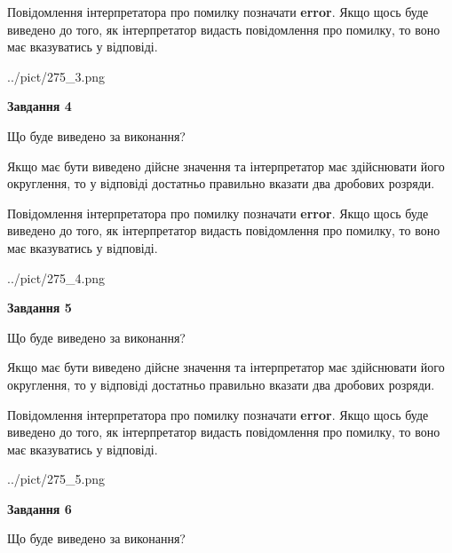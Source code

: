 \documentclass[12pt, ukrainian]{article}
\begin{document}
{\begin {Large}
Повідомлення інтерпретатора про помилку позначати \textbf{error}.
Якщо щось буде виведено до того, як інтерпретатор видасть повідомлення про помилку, 
то воно має вказуватись у відповіді. \par

\begin{center}
	{../pict/275_3.png}
\end{center}
\newpage

{\begin {center}\textbf{Завдання 4}\end {center}}\par
Що буде виведено за виконання? \par

Якщо має бути виведено дійсне значення та інтерпретатор має здійснювати його округлення, 
то у відповіді достатньо правильно вказати два дробових розряди.

Повідомлення інтерпретатора про помилку позначати \textbf{error}.
Якщо щось буде виведено до того, як інтерпретатор видасть повідомлення про помилку, 
то воно має вказуватись у відповіді. \par

\begin{center}
	{../pict/275_4.png}
\end{center}
\newpage

{\begin {center}\textbf{Завдання 5}\end {center}}\par
Що буде виведено за виконання? \par

Якщо має бути виведено дійсне значення та інтерпретатор має здійснювати його округлення, 
то у відповіді достатньо правильно вказати два дробових розряди.

Повідомлення інтерпретатора про помилку позначати \textbf{error}.
Якщо щось буде виведено до того, як інтерпретатор видасть повідомлення про помилку, 
то воно має вказуватись у відповіді. \par

\begin{center}
	{../pict/275_5.png}
\end{center}
\newpage

{\begin {center}\textbf{Завдання 6}\end {center}}\par
Що буде виведено за виконання? \par


\end{Large}}
\end{document}
